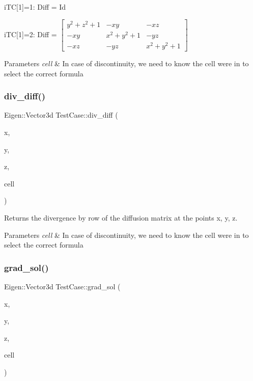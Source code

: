 i\+TC\mbox{[}1\mbox{]}=1\+: Diff = Id

i\+TC\mbox{[}1\mbox{]}=2\+: Diff = $\left[\begin{array}{ccc}y^2+z^2+1 & -xy & -xz\\ -xy & x^2+y^2+1 & -yz\\ -xz & -yz & x^2+y^2+1\end{array}\right]$ 
\begin{DoxyParams}{Parameters}
{\em cell} & In case of discontinuity, we need to know the cell we\textquotesingle{}re in to select the correct formula \\
\hline
\end{DoxyParams}
\mbox{\label{classTestCase_ab716e30f77a05679480ab42c9d04b606}} 
\subsubsection{\texorpdfstring{div\+\_\+diff()}{div\_diff()}}
{\footnotesize\ttfamily Eigen\+::\+Vector3d Test\+Case\+::div\+\_\+diff (\begin{DoxyParamCaption}\item[{const double}]{x,  }\item[{const double}]{y,  }\item[{const double}]{z,  }\item[{const \hyperlink{classHArDCore3D_1_1Cell}{Cell} $\ast$}]{cell }\end{DoxyParamCaption})}



Returns the divergence by row of the diffusion matrix at the points x, y, z. 


\begin{DoxyParams}{Parameters}
{\em cell} & In case of discontinuity, we need to know the cell we\textquotesingle{}re in to select the correct formula \\
\hline
\end{DoxyParams}
\mbox{\label{classTestCase_a46b6847f3cdeca43af4b7c34e85748b9}} 
\subsubsection{\texorpdfstring{grad\+\_\+sol()}{grad\_sol()}}
{\footnotesize\ttfamily Eigen\+::\+Vector3d Test\+Case\+::grad\+\_\+sol (\begin{DoxyParamCaption}\item[{const double}]{x,  }\item[{const double}]{y,  }\item[{const double}]{z,  }\item[{const \hyperlink{classHArDCore3D_1_1Cell}{Cell} $\ast$}]{cell }\end{DoxyParamCaption})}



